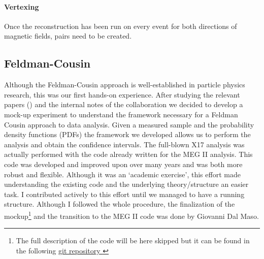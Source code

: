 \begin{refsection}
        \paragraph{Vertexing}
        Once the reconstruction has been run on every event for both directions of magnetic fields, pairs need to be created.

    \subsection{Feldman-Cousin}
        Although the Feldman-Cousin approach is well-established in particle physics research, this was our first hands-on experience. 
        After studying the relevant papers (\cite{feldman:1998}\cite{feldman:2011}) and the internal notes of the collaboration we decided to develop a mock-up experiment to understand the framework necessary for a Feldman Cousin approach to data analysis.  
        Given a measured sample and the probability density functions (PDFs) the framework we developed allows us to perform the analysis and obtain the confidence intervals.
        The full-blown X17 analysis was actually performed with the code already written for the MEG II analysis. This code was developed and improved upon over many years and was both more robust and flexible. 
        Although it was an `academic exercise', this effort made understanding the existing code and the underlying theory/structure an easier task.  
        I contributed actively to this effort until we managed to have a running structure.
        Although I followed the whole procedure, the finalization of the mockup\footnote{ The full description of the code will be here skipped but it can be found in the following 
        \href{https://github.com/gdalmaso96/X17_LL_mock_up}{\underline{git repository \faGithubSquare}}} and the transition to the MEG II code was done by Giovanni Dal Maso.


\end{refsection}
